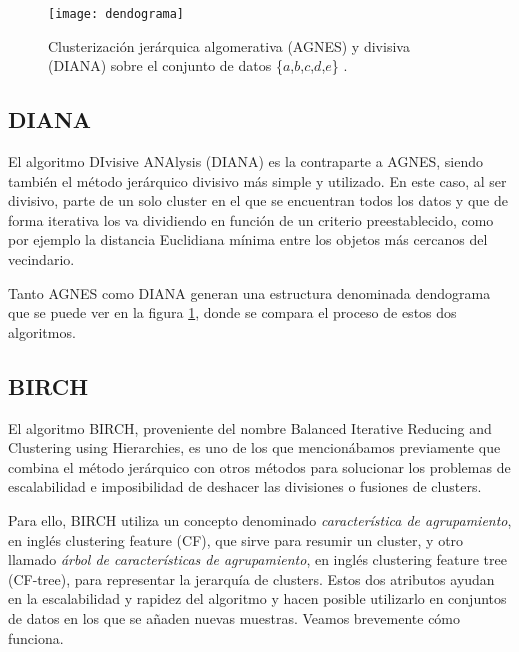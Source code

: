\documentclass[10pt, a4paper]{article}
\begin{document}
\begin{figure}[!ht]
\centering
\texttt{[image: dendograma]}
\caption{Clusterización jerárquica algomerativa (AGNES) y divisiva (DIANA) sobre el conjunto de datos \{$a$,$b$,$c$,$d$,$e$\} \cite{LIBRO}.}
\label{fig:dendograma}
\end{figure}





\subsection{\textbf{DIANA}} \label{subsec:DIANA}

\cite{jerarquico} El algoritmo DIvisive ANAlysis (DIANA) es la contraparte a AGNES, siendo también el método jerárquico divisivo más simple y utilizado. En este caso, al ser divisivo, parte de un solo cluster en el que se encuentran todos los datos y que de forma iterativa los va dividiendo en función de un criterio preestablecido, como por ejemplo la distancia Euclidiana mínima entre los objetos más cercanos del vecindario.

Tanto AGNES como DIANA generan una estructura denominada dendograma que se puede ver en la figura \ref{fig:dendograma}, donde se compara el proceso de estos dos algoritmos.




\subsection{\textbf{BIRCH}} \label{subsec:BIRCH}

\cite{BIRCH, BIRCH 2} El algoritmo BIRCH, proveniente del nombre Balanced Iterative Reducing and Clustering using Hierarchies, es uno de los que mencionábamos previamente que combina el método jerárquico con otros métodos para solucionar los problemas de escalabilidad e imposibilidad de deshacer las divisiones o fusiones de clusters.

Para ello, BIRCH utiliza un concepto denominado \textit{característica de agrupamiento}, en inglés clustering feature (CF), que sirve para resumir un cluster, y otro llamado \textit{árbol de características de agrupamiento}, en inglés clustering feature tree (CF-tree), para representar la jerarquía de clusters. Estos dos atributos ayudan en la escalabilidad y rapidez del algoritmo y hacen posible utilizarlo en conjuntos de datos en los que se añaden nuevas muestras. Veamos brevemente cómo funciona.
\end{document}
